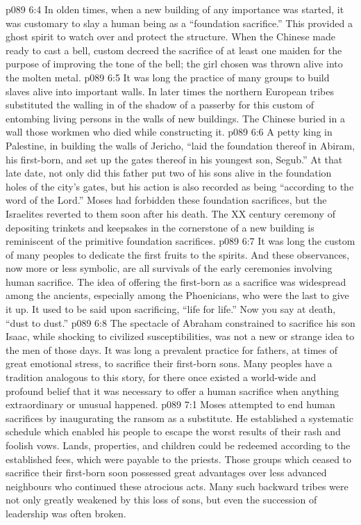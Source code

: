 \vs p089 6:4 \pc In olden times, when a new building of any importance was started, it was customary to slay a human being as a “foundation sacrifice.” This provided a ghost spirit to watch over and protect the structure. When the Chinese made ready to cast a bell, custom decreed the sacrifice of at least one maiden for the purpose of improving the tone of the bell; the girl chosen was thrown alive into the molten metal.
\vs p089 6:5 It was long the practice of many groups to build slaves alive into important walls. In later times the northern European tribes substituted the walling in of the shadow of a passerby for this custom of entombing living persons in the walls of new buildings. The Chinese buried in a wall those workmen who died while constructing it.
\vs p089 6:6 A petty king in Palestine, in building the walls of Jericho, “laid the foundation thereof in Abiram, his first\hyp{}born, and set up the gates thereof in his youngest son, Segub.” At that late date, not only did this father put two of his sons alive in the foundation holes of the city’s gates, but his action is also recorded as being “according to the word of the Lord.” Moses had forbidden these foundation sacrifices, but the Israelites reverted to them soon after his death. The XX century ceremony of depositing trinkets and keepsakes in the cornerstone of a new building is reminiscent of the primitive foundation sacrifices.
\vs p089 6:7 \pc It was long the custom of many peoples to dedicate the first fruits to the spirits. And these observances, now more or less symbolic, are all survivals of the early ceremonies involving human sacrifice. The idea of offering the first\hyp{}born as a sacrifice was widespread among the ancients, especially among the Phoenicians, who were the last to give it up. It used to be said upon sacrificing, “life for life.” Now you say at death, “dust to dust.”
\vs p089 6:8 The spectacle of Abraham constrained to sacrifice his son Isaac, while shocking to civilized susceptibilities, was not a new or strange idea to the men of those days. It was long a prevalent practice for fathers, at times of great emotional stress, to sacrifice their first\hyp{}born sons. Many peoples have a tradition analogous to this story, for there once existed a world\hyp{}wide and profound belief that it was necessary to offer a human sacrifice when anything extraordinary or unusual happened.
\vs p089 7:1 Moses attempted to end human sacrifices by inaugurating the ransom as a substitute. He established a systematic schedule which enabled his people to escape the worst results of their rash and foolish vows. Lands, properties, and children could be redeemed according to the established fees, which were payable to the priests. Those groups which ceased to sacrifice their first\hyp{}born soon possessed great advantages over less advanced neighbours who continued these atrocious acts. Many such backward tribes were not only greatly weakened by this loss of sons, but even the succession of leadership was often broken.
